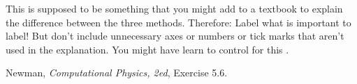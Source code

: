 \documentclass[12pt]{article}
\begin{document}
\begin{note}
  This is supposed to be something that you might add to a textbook to explain the difference between the three methods.
  Therefore: Label what is important to label!
  But don't include unnecessary axes or numbers or tick marks that aren't used in the explanation.
  You might have learn to control  for this \problemname.
\end{note}

\begin{problem}
  Newman, \textit{Computational Physics, 2ed}, Exercise 5.6.
\end{problem}
\end{document}
